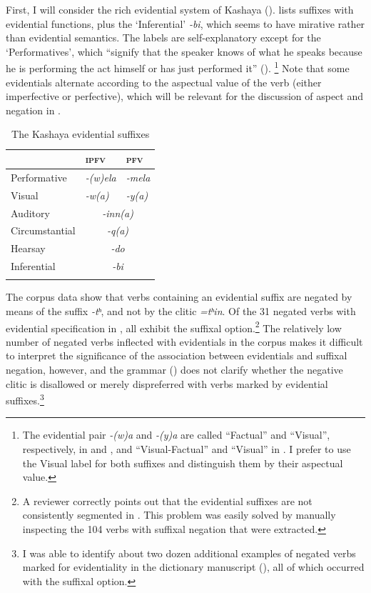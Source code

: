 \documentclass[output=paper,modfonts,nonflat,colorlinks,citecolor=brown]{langscibook}
\begin{document}
First, I will consider the rich evidential system of Kashaya (\citealt{Oswalt1986}).  lists suffixes with evidential functions, plus the `Inferential' \textit{-bi}, which seems to have mirative rather than evidential semantics. The labels are self-explanatory except for the `Performatives', which ``signify that the speaker knows of what he speaks because he is performing the act himself or has just performed it'' (\citeyear[34]{Oswalt1986}). %
\footnote{%
The evidential pair \textit{-(w)a} and \textit{-(y)a} are called ``Factual'' and ``Visual'', respectively, in \citet{Oswalt1961} and \citet{Buckley1994}, and ``Visual-Factual'' and ``Visual'' in \citet{Oswalt1990}. I prefer to use the Visual label for both suffixes and distinguish them by their aspectual value.
} %
Note that some evidentials alternate according to the aspectual value of the verb (either imperfective or perfective), which will be relevant for the discussion of aspect and negation in .

\begin{table}[t]
\caption{The Kashaya evidential suffixes}
\label{tab:BO:evid}
 \begin{tabular}{lll}
  \lsptoprule
  & \textsc{ipfv} & \textsc{pfv}\\
  \midrule
Performative  &  \itshape -(w)ela & \itshape -mela  \\
Visual & \itshape -w(a) & \itshape -y(a) \\
Auditory  & \multicolumn{2}{c}{\itshape -inn(a)} \\
Circumstantial  & \multicolumn{2}{c}{\itshape -q(a)} \\
Hearsay\strut & \multicolumn{2}{c}{\itshape -do} \\ \hdashline
Inferential\strut & \multicolumn{2}{c}{\itshape -bi} \\
  \lspbottomrule
 \end{tabular}
\end{table}

The corpus data show that verbs containing an evidential suffix are negated by means of the suffix \textit{-tʰ}, and not by the clitic \textit{=tʰin}. Of the 31 negated verbs with evidential specification in , all exhibit the suffixal option.\footnote{A reviewer correctly points out that the evidential suffixes are not consistently segmented in \citet{Buckley2019}. This problem was easily solved by manually inspecting the 104 verbs with suffixal negation that were extracted.} The relatively low number of negated verbs inflected with evidentials in the corpus makes it difficult to interpret the significance of the association between evidentials and suffixal negation, however, and the grammar (\citealt{Oswalt1961}) does not clarify whether the negative clitic is disallowed or merely dispreferred with verbs marked by evidential suffixes.\footnote{I was able to identify about two dozen additional examples of negated verbs marked for evidentiality in the dictionary manuscript (\citealt{Oswalt}), all of which occurred with the suffixal option.}
\end{document}
